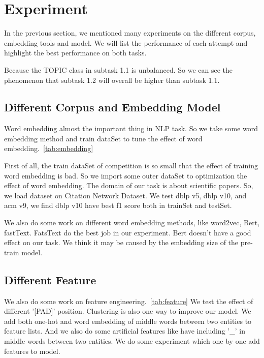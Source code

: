 \section{Experiment}
\label{sec:experiment}

In the previous section, we mentioned many experiments on the different corpus, embedding tools and model. We will list the performance of each attempt and highlight the best performance on both tasks.

Because the TOPIC class in subtask 1.1 is unbalanced. So we can see the phenomenon that subtask 1.2 will overall be higher than subtask 1.1.

\subsection{Different Corpus and Embedding Model}
\label{sec:different_corpus_and_embedding_model}

Word embedding almost the important thing in NLP task. So we take some word embedding method and train dataSet to tune the effect of word embedding.~\ref{tab:embedding}

First of all, the train dataSet of competition is so small that the effect of training word embedding is bad. So we import some outer dataSet to optimization the effect of word embedding. The domain of our task is about scientific papers. So, we load dataset on Citation Network Dataset. We test dblp v5, dblp v10, and acm v9, we find dblp v10 have best f1 score both in trainSet and testSet.

We also do some work on different word embedding methods, like word2vec, Bert, fastText. FatsText do the best job in our experiment. Bert doesn't have a good effect on our task. We think it may be caused by the embedding size of the pre-train model.



\subsection{Different Feature}
\label{sec:different_feature}

We also do some work on feature engineering.~\ref{tab:feature} We test the effect of different '[PAD]' position. Clustering is also one way to improve our model. We add both one-hot and word embedding of middle words between two entities to feature lists. And we also do some artificial features like have including '\_' in middle words between two entities. We do some experiment which one by one add features to model.

